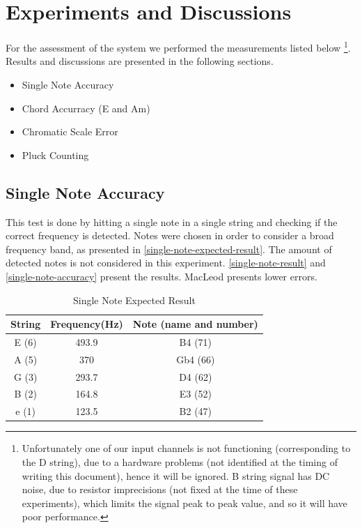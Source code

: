 \chapter{Experiments and Discussions}
For the assessment of the system we performed the measurements listed below
\footnote{
  Unfortunately one of our input channels is not functioning (corresponding to the
  D string), due to a hardware problems (not identified at the timing of writing this document),
  hence it will be ignored. B string signal has DC noise,
  due to resistor imprecisions (not fixed at the time of these experiments),
  which limits the signal peak to peak value, and so it will have poor performance.
}.
Results and discussions are presented in the following sections.

\begin{itemize}
  \item Single Note Accuracy
  \item Chord Accurracy (E and Am)
  \item Chromatic Scale Error
  \item Pluck Counting
\end{itemize}


\section{Single Note Accuracy}
This test is done by hitting a single note in a single string and checking if the correct
frequency is detected. Notes were chosen in order to consider a broad frequency band,
as presented in \autoref{single-note-expected-result}. The amount of detected notes is
not considered in this experiment. \autoref{single-note-result} and \autoref{single-note-accuracy}
present the results. MacLeod presents lower errors.

\begin{table}[htb]
  \begin{center}
    \ABNTEXreducedfont
    \caption[Single Note Expected Result]{Single Note Expected Result}
    \label{single-note-expected-result}
    \begin{tabular}{c | c | c}
      \hline
      String & Frequency(Hz) & Note (name and number)\\
      \hline \hline
      E (6) & 493.9 & B4 (71) \\ \hline
      A (5) & 370 & Gb4 (66) \\ \hline
      G (3) & 293.7 & D4 (62) \\ \hline
      B (2) & 164.8 & E3 (52) \\ \hline
      e (1) & 123.5 & B2 (47) \\ \hline
    \end{tabular}
  \end{center}
\end{table}

